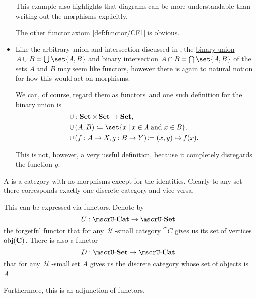\begin{example}
\begin{itemize}
    This example also highlights that diagrams can be more understandable than writing out the morphisms explicitly.

    The other functor axiom \ref{def:functor/CF1} is obvious.

    \item Like the arbitrary union and intersection discussed in , the \hyperref[def:basic_set_operations/union]{binary union} \( A \cup B = \bigcup\set{ A, B } \) and \hyperref[def:basic_set_operations/intersection]{binary intersection} \( A \cap B = \bigcap\set{ A, B } \) of the sets \( A \) and \( B \) may seem like functors, however there is again to natural notion for how this would act on morphisms.

    We can, of course, regard them as functors, and one such definition for the binary union is
    \begin{equation*}
      \begin{aligned}
        &{\cup}: \cat{Set} \times \cat{Set} \to \cat{Set}, \\
        &{\cup} \thinspace (A, B) \coloneqq \set{ x \given x \in A \T{and} x \in B }, \\
        &{\cup} \thinspace (f: A \to X, g: B \to Y) \coloneqq (x, y) \mapsto f(x).
      \end{aligned}
    \end{equation*}

    This is not, however, a very useful definition, because it completely disregards the function \( g \).
  \end{itemize}
\end{example}

\begin{example}\label{ex:discrete_category}
  A  is a category with no morphisms except for the identities. Clearly to any set there corresponds exactly one discrete category and vice versa.

  This can be expressed via functors. Denote by
  \begin{equation*}
    U: \ucat{Cat} \to \ucat{Set}
  \end{equation*}
  the forgetful functor that for any \( \mscrU \)-small category \( \cat{C} \) gives us its set of vertices \( \operatorname{obj}(\operatorname{\mathbf{C}}) \). There is also a functor
  \begin{equation*}
    D: \ucat{Set} \to \ucat{Cat}
  \end{equation*}
  that for any \( \mscrU \)-small set \( A \) gives us the discrete category whose set of objects is \( A \).

  Furthermore, this is an adjunction of functors.
\end{example}

